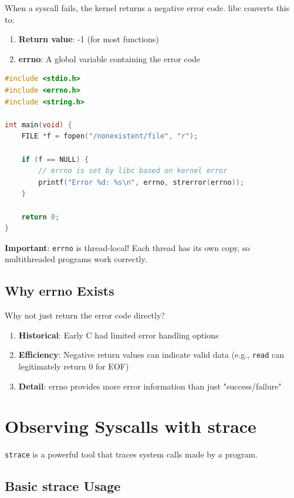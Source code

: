 When a syscall fails, the kernel returns a negative error code. libc converts this to:

\begin{enumerate}
    \item \textbf{Return value}: -1 (for most functions)
    \item \textbf{errno}: A global variable containing the error code
\end{enumerate}

\begin{lstlisting}[language=C]
#include <stdio.h>
#include <errno.h>
#include <string.h>

int main(void) {
    FILE *f = fopen("/nonexistent/file", "r");

    if (f == NULL) {
        // errno is set by libc based on kernel error
        printf("Error %d: %s\n", errno, strerror(errno));
    }

    return 0;
}
\end{lstlisting}

\textbf{Important}: \texttt{errno} is thread-local! Each thread has its own copy, so multithreaded programs work correctly.

\subsection{Why errno Exists}

Why not just return the error code directly?

\begin{enumerate}
    \item \textbf{Historical}: Early C had limited error handling options
    \item \textbf{Efficiency}: Negative return values can indicate valid data (e.g., \texttt{read} can legitimately return 0 for EOF)
    \item \textbf{Detail}: errno provides more error information than just "success/failure"
\end{enumerate}

\section{Observing Syscalls with strace}

\texttt{strace} is a powerful tool that traces system calls made by a program.

\subsection{Basic strace Usage}


